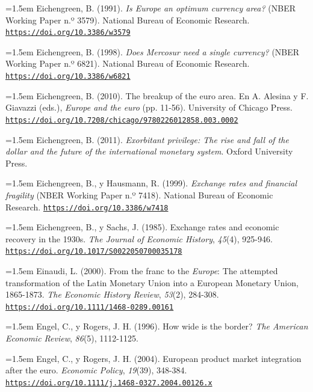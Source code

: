 \documentclass[10pt,a4paper]{article}
\begin{document}
\noindent\hangindent=1.5em Eichengreen, B. (1991). \textit{Is Europe an optimum currency area?} (NBER Working Paper n.º 3579). National Bureau of Economic Research. \href{https://doi.org/10.3386/w3579}{\nolinkurl{https://doi.org/10.3386/w3579}}

\noindent\hangindent=1.5em Eichengreen, B. (1998). \textit{Does Mercosur need a single currency?} (NBER Working Paper n.º 6821). National Bureau of Economic Research. \href{https://doi.org/10.3386/w6821}{\nolinkurl{https://doi.org/10.3386/w6821}}

\noindent\hangindent=1.5em Eichengreen, B. (2010). The breakup of the euro area. En A. Alesina y F. Giavazzi (eds.), \textit{Europe and the euro} (pp. 11-56). University of Chicago Press. \href{https://doi.org/10.7208/chicago/9780226012858.003.0002}{\nolinkurl{https://doi.org/10.7208/chicago/9780226012858.003.0002}}

\noindent\hangindent=1.5em Eichengreen, B. (2011). \textit{Exorbitant privilege: The rise and fall of the dollar and the future of the international monetary system}. Oxford University Press.

\noindent\hangindent=1.5em Eichengreen, B., y Hausmann, R. (1999). \textit{Exchange rates and financial fragility} (NBER Working Paper n.º 7418). National Bureau of Economic Research. \href{https://doi.org/10.3386/w7418}{\nolinkurl{https://doi.org/10.3386/w7418}}

\noindent\hangindent=1.5em Eichengreen, B., y Sachs, J. (1985). Exchange rates and economic recovery in the 1930s. \textit{The Journal of Economic History}, \textit{45}(4), 925-946. \href{https://doi.org/10.1017/S0022050700035178}{\nolinkurl{https://doi.org/10.1017/S0022050700035178}}

\noindent\hangindent=1.5em Einaudi, L. (2000). From the franc to the \textit{Europe}: The attempted transformation of the Latin Monetary Union into a European Monetary Union, 1865-1873. \textit{The Economic History Review}, \textit{53}(2), 284-308. \href{https://doi.org/10.1111/1468-0289.00161}{\nolinkurl{https://doi.org/10.1111/1468-0289.00161}}

\noindent\hangindent=1.5em Engel, C., y Rogers, J. H. (1996). How wide is the border? \textit{The American Economic Review}, \textit{86}(5), 1112-1125.

\noindent\hangindent=1.5em Engel, C., y Rogers, J. H. (2004). European product market integration after the euro. \textit{Economic Policy}, \textit{19}(39), 348-384. \href{https://doi.org/10.1111/j.1468-0327.2004.00126.x}{\nolinkurl{https://doi.org/10.1111/j.1468-0327.2004.00126.x}}
\end{document}
